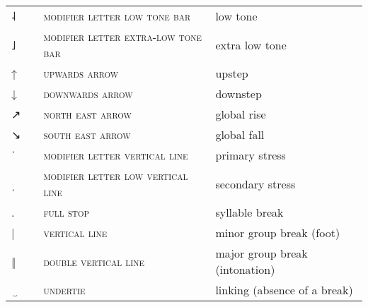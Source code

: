 \begin{center}
\begin{xtabular}{ l L{1.2cm} L{5.6cm} L{4cm} }
{˨} &  & \textsc{modifier letter low tone bar} & low tone \\
{˩} &  & \textsc{modifier letter extra-low tone bar} & extra low tone \\
{↑} &  & \textsc{upwards arrow} & upstep \\
{↓} &  & \textsc{downwards arrow} & downstep \\
{↗} &  & \textsc{north east arrow} & global rise \\
{↘} &  & \textsc{south east arrow} & global fall \\
\midrule
{\large ˈ} &  & \textsc{modifier letter vertical line} & primary stress \\
{\large ˌ} &  & \textsc{modifier letter low vertical line} & secondary stress \\
{\large.} &  & \textsc{full stop} & syllable break \\
{|} &  & \textsc{vertical line} & minor group break (foot) \\
{‖} &  & \textsc{double vertical line} & major group break (intonation) \\
{ ‿} &  & \textsc{undertie} & linking (absence of a break) \\
\end{xtabular}
\end{center}